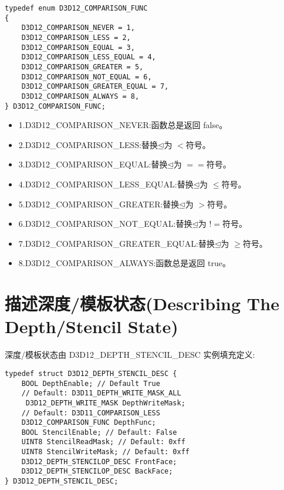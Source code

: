 \begin{lstlisting}
typedef enum D3D12_COMPARISON_FUNC
{
    D3D12_COMPARISON_NEVER = 1,
    D3D12_COMPARISON_LESS = 2,
    D3D12_COMPARISON_EQUAL = 3,
    D3D12_COMPARISON_LESS_EQUAL = 4,
    D3D12_COMPARISON_GREATER = 5,
    D3D12_COMPARISON_NOT_EQUAL = 6,
    D3D12_COMPARISON_GREATER_EQUAL = 7,
    D3D12_COMPARISON_ALWAYS = 8,
} D3D12_COMPARISON_FUNC;
\end{lstlisting}
\begin{itemize}
  \item 1.D3D12\_COMPARISON\_NEVER:函数总是返回 false。
  \item 2.D3D12\_COMPARISON\_LESS:替换$\unlhd$为 $<$符号。
  \item 3.D3D12\_COMPARISON\_EQUAL:替换$\unlhd$为 $==$符号。
  \item 4.D3D12\_COMPARISON\_LESS\_EQUAL:替换$\unlhd$为 $\leq$符号。
  \item 5.D3D12\_COMPARISON\_GREATER:替换$\unlhd$为 $>$符号。
  \item 6.D3D12\_COMPARISON\_NOT\_EQUAL:替换$\unlhd$为 $!=$符号。
  \item 7.D3D12\_COMPARISON\_GREATER\_EQUAL:替换$\unlhd$为 $\geq$符号。
  \item 8.D3D12\_COMPARISON\_ALWAYS:函数总是返回 true。
\end{itemize}

\section{描述深度/模板状态(Describing The Depth/Stencil State)}
\begin{flushleft}
深度/模板状态由 D3D12\_DEPTH\_STENCIL\_DESC 实例填充定义:\\ 
\end{flushleft}

\begin{lstlisting}
typedef struct D3D12_DEPTH_STENCIL_DESC {
    BOOL DepthEnable; // Default True
    // Default: D3D11_DEPTH_WRITE_MASK_ALL
     D3D12_DEPTH_WRITE_MASK DepthWriteMask;
    // Default: D3D11_COMPARISON_LESS
    D3D12_COMPARISON_FUNC DepthFunc;
    BOOL StencilEnable; // Default: False
    UINT8 StencilReadMask; // Default: 0xff
    UINT8 StencilWriteMask; // Default: 0xff
    D3D12_DEPTH_STENCILOP_DESC FrontFace;
    D3D12_DEPTH_STENCILOP_DESC BackFace;
} D3D12_DEPTH_STENCIL_DESC;
\end{lstlisting}

